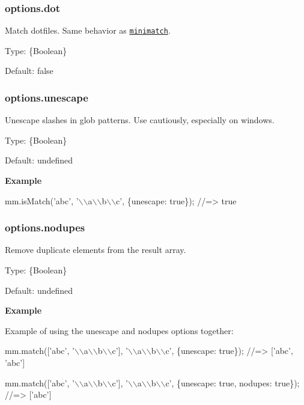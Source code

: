 \subsubsection*{options.\+dot}

Match dotfiles. Same behavior as \href{https://github.com/isaacs/minimatch}{\tt minimatch}.

Type\+: {\ttfamily \{Boolean\}}

Default\+: {\ttfamily false}

\subsubsection*{options.\+unescape}

Unescape slashes in glob patterns. Use cautiously, especially on windows.

Type\+: {\ttfamily \{Boolean\}}

Default\+: {\ttfamily undefined}

{\bfseries Example}


\begin{DoxyCode}
mm.isMatch('abc', '\(\backslash\)\(\backslash\)a\(\backslash\)\(\backslash\)b\(\backslash\)\(\backslash\)c', \{unescape: true\});
//=> true
\end{DoxyCode}


\subsubsection*{options.\+nodupes}

Remove duplicate elements from the result array.

Type\+: {\ttfamily \{Boolean\}}

Default\+: {\ttfamily undefined}

{\bfseries Example}

Example of using the {\ttfamily unescape} and {\ttfamily nodupes} options together\+:


\begin{DoxyCode}
mm.match(['abc', '\(\backslash\)\(\backslash\)a\(\backslash\)\(\backslash\)b\(\backslash\)\(\backslash\)c'], '\(\backslash\)\(\backslash\)a\(\backslash\)\(\backslash\)b\(\backslash\)\(\backslash\)c', \{unescape: true\});
//=> ['abc', 'abc']

mm.match(['abc', '\(\backslash\)\(\backslash\)a\(\backslash\)\(\backslash\)b\(\backslash\)\(\backslash\)c'], '\(\backslash\)\(\backslash\)a\(\backslash\)\(\backslash\)b\(\backslash\)\(\backslash\)c', \{unescape: true, nodupes: true\});
//=> ['abc']
\end{DoxyCode}


